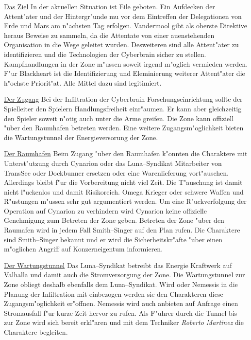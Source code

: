 \underline{Das Ziel} In der aktuellen Situation ist Eile geboten. Ein Aufdecken der Attent"ater und der Hintergr"unde mu\3 vor dem Eintreffen der Delegationen von Erde und Mars am n"achsten Tag erfolgen. Vandermool gibt als oberste Direktive heraus Beweise zu sammeln, da\3 die Attentate von einer au\3enstehenden Organisation in die Wege geleitet wurden. Desweiteren sind alle Attent"ater zu identifizieren und die Technologien der Cyberbrain sicher zu stellen. Kampfhandlungen in der Zone m"ussen soweit irgend m"oglich vermieden werden. F"ur Blackheart ist die Identifizierung und Eleminierung weiterer Attent"ater die h"ochste Priorit"at. Alle Mittel dazu sind legitimiert. 

\underline{Der Zugang} Bei der Infiltration der Cyberbrain Forschungseinrichtung sollte der Spielleiter den Spielern Handlungsfreiheit einr"aumen. Er kann aber gleichzeitig den Spieler soweit n"otig auch unter die Arme greifen. Die Zone kann offiziell "uber den Raumhafen betreten werden. Eine weitere Zugangsm"oglichkeit bieten die Wartungstunnel der Energieversorung der Zone.

\underline{Der Raumhafen} Beim Zugang "uber den Raumhafen k"onnten die Charaktere mit Unterst"utzung durch Cynarion oder das Luna--Syndikat Mitarbeiter von TransSec oder Dockbunner ersetzen oder eine Warenlieferung vort"auschen. Allerdings bleibt f"ur die Vorbereitung nicht viel Zeit. Die T"auschung ist damit nicht l"uckenlos und damit Risikoreich. Omega Krieger oder schwere Waffen und R"ustungen m"ussen sehr gut argumentiert werden. Um eine R"uckverfolgung der Operation auf Cynarion zu verhindern wird Cynarion keine offizielle Genehmigung zum Betreten der Zone geben. Betreten der Zone "uber den Raumafen wird in jedem Fall Smith--Singer auf den Plan rufen. Die Charaktere sind Smith--Singer bekannt und er wird die Sicherheitskr"afte "uber einen m"oglichen Angriff auf Konzerneigentum informieren. 

\underline{Der Wartungstunnel} Das Luna--Syndikat betreibt das Energie Kraftwerk auf Valhalla und damit auch die Stromversorgung der Zone. Die Wartungstunnel zur Zone obliegt deshalb ebenfalls dem Luna--Syndikat. Wird \xl{} oder Nemessis in die Planung der Infiltration mit einbezogen werden sie den Charakteren diese Zugangsm"oglichkeit er"offnen. Nemessis wird auch anbieten auf Anfrage einen Stromausfall f"ur kurze Zeit hervor zu rufen. Als F"uhrer durch die Tunnel bis zur Zone wird sich \xl{} bereit erkl"aren und mit dem Techniker \emph{Roberto Martinez} die Charaktere begleiten.


